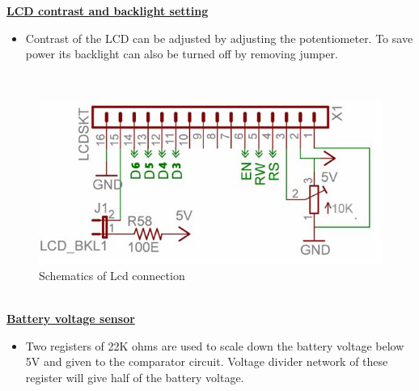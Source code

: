 \documentclass[a4paper,12pt,oneside]{book}
\begin{document}
	\underline{\textbf{\Large{LCD contrast and backlight setting}}}
	\begin{itemize}
	\item{Contrast of the LCD can be adjusted by adjusting the potentiometer. To save power its backlight can also be turned off by removing jumper.}
	\end{itemize}
	
	\hfill\\
	\begin{figure}[h!]
		\caption{Schematics of Lcd connection}
		\includegraphics[width=\textwidth]{./HardwareManual/lcd_connection.png}
	\end{figure}	
	\hfill\\
	
	\underline{\textbf{\Large{Battery voltage sensor}}}
	\begin{itemize}
		\item{Two registers of 22K ohms are used to scale down the battery voltage below 5V and given to the
			comparator circuit. Voltage divider network of these register will give half of the
			battery voltage.}
	\end{itemize}
\end{document}
